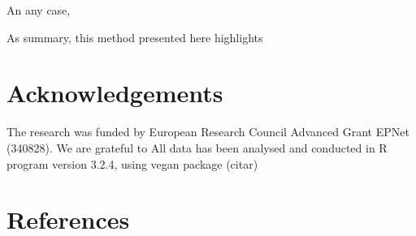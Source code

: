 \documentclass[review]{elsarticle}
\begin{document}
 

An any case, 

As summary, this method presented here highlights  


\section{Acknowledgements}

The research was funded by European Research Council Advanced Grant EPNet (340828). We are grateful to 
All data has been analysed and conducted in R program version 3.2.4, using vegan package (citar) 


\section{References}


\end{document}

